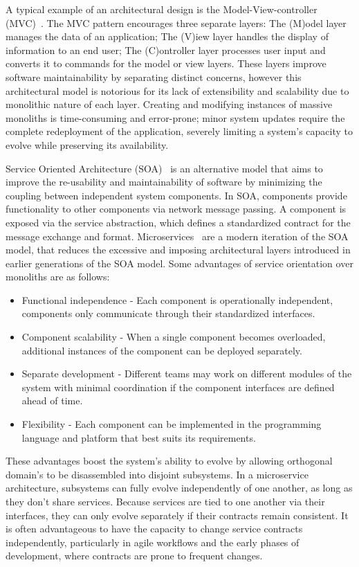 A typical example of an architectural design is the Model-View-controller (MVC)~\cite{mvc, microservices}.
The MVC pattern encourages three separate layers: The (M)odel layer manages the data of an application;
The (V)iew layer handles the display of information to an end user; The (C)ontroller layer
processes user input and converts it to commands for the model or view layers.
These layers improve software maintainability by separating distinct concerns,
however this architectural model is notorious for its lack of extensibility and scalability due to monolithic nature of each layer.
Creating and modifying instances of massive monoliths is time-consuming and error-prone;
minor system updates require the complete redeployment of the application, severely limiting a system's capacity to evolve while preserving its availability.

Service Oriented Architecture (SOA)~\cite{7} is an alternative model that aims to
improve the re-usability and maintainability of software by minimizing the coupling between independent system components.
In SOA, components provide functionality to other components via network message passing.
A component is exposed via the service abstraction, which defines a standardized contract for the message exchange and format.
Microservices~\cite{microservices} are a modern iteration of the SOA model,
that reduces the excessive and imposing architectural layers introduced in earlier generations of the SOA model.
Some advantages of service orientation over monoliths are as follows:

\begin{itemize}
    \setlength\itemsep{0em}
    \item Functional independence - Each component is operationally independent, components only communicate through their standardized interfaces.
    \item Component scalability - When a single component becomes overloaded, additional instances of the component can be deployed separately.
    \item Separate development - Different teams may work on different modules of the system with minimal coordination if the component interfaces are defined ahead of time.
    \item Flexibility - Each component can be implemented in the programming language and platform that best suits its requirements.
\end{itemize}

These advantages boost the system's ability to evolve by allowing orthogonal domain's to be disassembled into disjoint subsystems.
In a microservice architecture, subsystems can fully evolve independently of one another, as long as they don't share services.
Because services are tied to one another via their interfaces, they can only evolve separately if their contracts remain consistent.
It is often advantageous to have the capacity to change service contracts independently,
particularly in agile workflows and the early phases of development, where contracts are prone to frequent changes.

